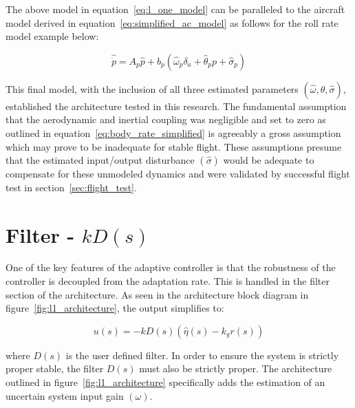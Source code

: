 The above model in equation~\ref{eq:l_one_model} can be paralleled to the aircraft model derived in equation~\ref{eq:simplified_ac_model} as follows for the roll rate model example below:

\begin{equation}
	\hat{\dot{p}}=A_p\hat{p}+b_p\left(\hat{\omega}_p\delta_a+\hat{\theta}_pp+\hat{\sigma}_p\right)
\end{equation}

This final model, with the inclusion of all three estimated parameters $(\hat{\omega}, \hat{\theta}, \hat{\sigma})$, established the architecture tested in this research.  The fundamental assumption that the aerodynamic and inertial coupling was negligible and set to zero as outlined in equation~\ref{eq:body_rate_simplified} is agreeably a gross assumption which may prove to be inadequate for stable flight.  These assumptions presume that the estimated input/output disturbance $(\hat{\sigma})$ would be adequate to compensate for these unmodeled dynamics and were validated by successful flight test in section~\ref{sec:flight_test}.

\section{\Lone Filter - $kD(s)$}
One of the key features of the \Lone adaptive controller is that the robustness of the controller is decoupled from the adaptation rate.  This is handled in the filter section of the \Lone architecture.  As seen in the architecture block diagram in figure~\ref{fig:l1_architecture}, the output simplifies to:

\begin{equation}
u(s)=-kD(s)(\hat{\eta}(s)-k_gr(s))
\end{equation}

where $D(s)$ is the user defined filter.  In order to ensure the system is strictly proper stable, the filter $D(s)$ must also be strictly proper.  The architecture outlined in figure~\ref{fig:l1_architecture} specifically adds the estimation of an uncertain system input gain $(\omega)$.  

